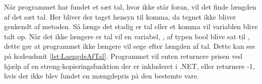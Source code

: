 Når programmet har fundet et sæt tal, hvor  ikke står foran, vil det finde længden af det sæt tal. Her bliver der taget hensyn til komma, da tegnet ikke bliver genkendt af  metoden.
Så længe det stadig er tal eller et komma vil variablen  blive talt op. Når det ikke længere er tal vil en variabel, , af typen bool blive sat til , dette gør at programmet ikke længere vil søge efter længden af tal. Dette kan ses på kodeudsnit \ref{lst:LaengdeAfTal}. Programmet vil enten returnere prisen ved hjælp af en streng-kopieringsfunktion der er inkluderet i .NET, eller returnere -1, hvis der ikke blev fundet en mængdepris på den bestemte vare.
